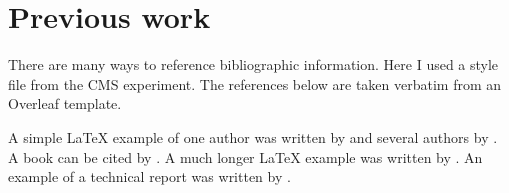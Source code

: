 \section{Previous work}\label{sec:2}

There are many ways to reference bibliographic information. Here I used a style file 
from the CMS experiment. The references below are taken verbatim 
from an Overleaf template.

A simple \LaTeX{} example of one author was written by \cite{moretti2003weighted}
and several authors by \cite{bechara1986use}.
A book can be cited by \cite{kleinrock1975queueing}.
A much longer \LaTeX{} example was written by \cite{maculan2003integer}.
An example of a technical report was written by \cite{HoracioYanasse}.
